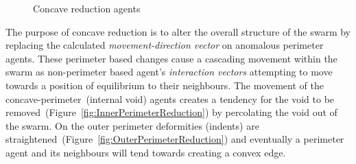 \begin{figure}[H]
\centering
{}
\caption[Concave reduction agents]{Concave reduction agents}
\label{fig:ConcaveReductionAgents}
\end{figure}

The purpose of concave reduction is to alter the overall structure of the swarm by replacing the calculated \textit{movement-direction vector} on anomalous perimeter agents. These perimeter based changes cause a cascading movement within the swarm as non-perimeter based agent's \textit{interaction vectors} attempting to move towards a position of equilibrium to their neighbours. The movement of the concave-perimeter~(internal void) agents creates a tendency for the void to be removed~(Figure~\ref{fig:InnerPerimeterReduction}) by percolating the void out of the swarm. On the outer perimeter deformities (indents) are straightened~(Figure~\ref{fig:OuterPerimeterReduction}) and eventually a perimeter agent and its neighbours will tend towards creating a convex edge.

